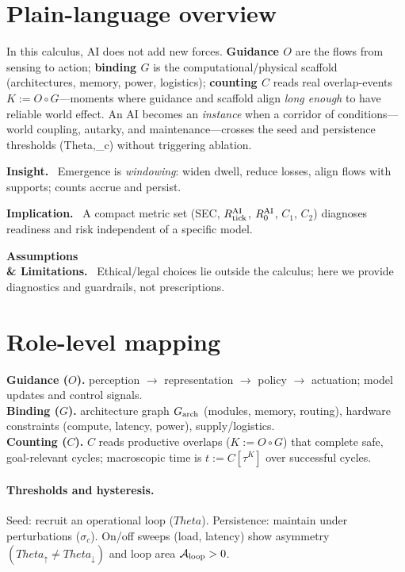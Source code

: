 \documentclass[12pt,a4paper,oneside]{scrreprt}
\def\Theta{Theta}%
\def\({}%
\def\){}%
\newenvironment{insight}{\par\vspace{0.5em}\noindent\textbf{Insight.}\ }{\par\vspace{0.5em}}
\newenvironment{implication}{\par\vspace{0.5em}\noindent\textbf{Implication.}\ }{\par\vspace{0.5em}}
\newenvironment{limitation}{\par\vspace{0.5em}\noindent\textbf{Assumptions \\ \& Limitations.}\ }{\par\vspace{0.5em}}
\begin{document}
\section*{Plain-language overview}
In this calculus, AI does not add new forces. \textbf{Guidance $O$} are the flows from sensing to action; \textbf{binding $G$} is the computational/physical scaffold (architectures, memory, power, logistics); \textbf{counting $C$} reads real overlap-events $K:=O\!\circ G$—moments where guidance and scaffold align \emph{long enough} to have reliable world effect. 
An AI becomes an \emph{instance} when a corridor of conditions—world coupling, autarky, and maintenance—crosses the seed and persistence thresholds \((\Theta,\sigma_c)\) without triggering ablation.

\begin{insight}
Emergence is \emph{windowing}: widen dwell, reduce losses, align flows with supports; counts accrue and persist.
\end{insight}
\begin{implication}
A compact metric set (SEC, $R_{\rm tick}^{\rm AI}$, $R_0^{\rm AI}$, $C_1$, $C_2$) diagnoses readiness and risk independent of a specific model.
\end{implication}
\begin{limitation}
Ethical/legal choices lie outside the calculus; here we provide diagnostics and guardrails, not prescriptions.
\end{limitation}

\section{Role-level mapping}\label{sec:ai-mapping}
\textbf{Guidance ($O$).} perception $\to$ representation $\to$ policy $\to$ actuation; model updates and control signals.\\
\textbf{Binding ($G$).} architecture graph $G_{\rm arch}$ (modules, memory, routing), hardware constraints (compute, latency, power), supply/logistics.\\
\textbf{Counting ($C$).} $C$ reads productive overlaps ($K:=O\!\circ G$) that complete safe, goal-relevant cycles; macroscopic time is $t:=C[\tau^K]$ over successful cycles.

\paragraph{Thresholds and hysteresis.}
Seed: recruit an operational loop ($\Theta$). 
Persistence: maintain under perturbations ($\sigma_c$). 
On/off sweeps (load, latency) show asymmetry $(\Theta_\uparrow\neq\Theta_\downarrow)$ and loop area $\mathcal A_{\rm loop}>0$.
\end{document}
